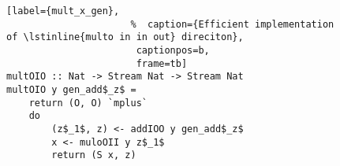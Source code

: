 \begin{figure}[!t]
  \centering
  \begin{minipage}{\columnwidth}
    \begin{lstlisting}[label={mult_x_gen},
                      %  caption={Efficient implementation of \lstinline{multo in in out} direciton},
                       captionpos=b,
                       frame=tb]
multOIO :: Nat -> Stream Nat -> Stream Nat
multOIO y gen_add$_z$ =
    return (O, O) `mplus`
    do
        (z$_1$, z) <- addIOO y gen_add$_z$
        x <- muloOII y z$_1$
        return (S x, z)
    \end{lstlisting}
  \end{minipage}
\end{figure}
